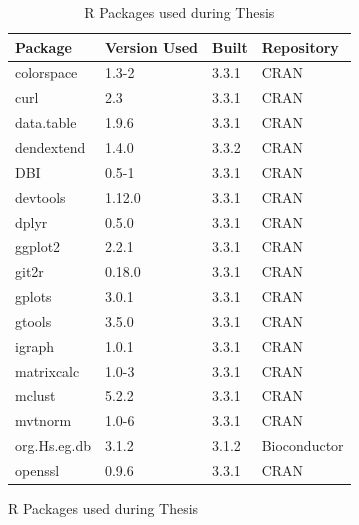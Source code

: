 \begin{figure}[!htp]
\begin{longtable}{llll}
\caption{R Packages used during Thesis}
\label{tab:computers_r_packages}
\\
\multicolumn{1}{l}{\bfseries Package}      & \multicolumn{1}{l}{\bfseries Version Used} & \multicolumn{1}{l}{\bfseries Built} & \multicolumn{1}{l}{\bfseries Repository}      \\
\hline  \rowcolor{black!10}
colorspace   & 1.3-2          & 3.3.1 & CRAN            \\
\rowcolor{black!5}
curl         & 2.3            & 3.3.1 & CRAN            \\
\rowcolor{black!10}
data.table   & 1.9.6          & 3.3.1 & CRAN            \\
\rowcolor{black!5}
dendextend   & 1.4.0          & 3.3.2 & CRAN            \\
\rowcolor{black!10}
DBI          & 0.5-1          & 3.3.1 & CRAN            \\
\rowcolor{black!5}
devtools     & 1.12.0         & 3.3.1 & CRAN            \\
\rowcolor{black!10}
dplyr        & 0.5.0          & 3.3.1 & CRAN            \\
\rowcolor{black!5}
ggplot2      & 2.2.1          & 3.3.1 & CRAN            \\
\rowcolor{black!10}
git2r        & 0.18.0         & 3.3.1 & CRAN            \\
\rowcolor{black!5}
gplots       & 3.0.1          & 3.3.1 & CRAN            \\
\rowcolor{black!10}
gtools       & 3.5.0          & 3.3.1 & CRAN            \\
\rowcolor{black!5}
igraph       & 1.0.1          & 3.3.1 & CRAN            \\
\rowcolor{black!10}
matrixcalc   & 1.0-3          & 3.3.1 & CRAN            \\
\rowcolor{black!5}
mclust       & 5.2.2          & 3.3.1 & CRAN            \\
\rowcolor{black!10}
mvtnorm      & 1.0-6          & 3.3.1 & CRAN            \\
\rowcolor{black!5}
org.Hs.eg.db & 3.1.2          & 3.1.2 & Bioconductor    \\
\rowcolor{black!10}
openssl      & 0.9.6          & 3.3.1 & CRAN            \\

\end{longtable}
\end{figure}
